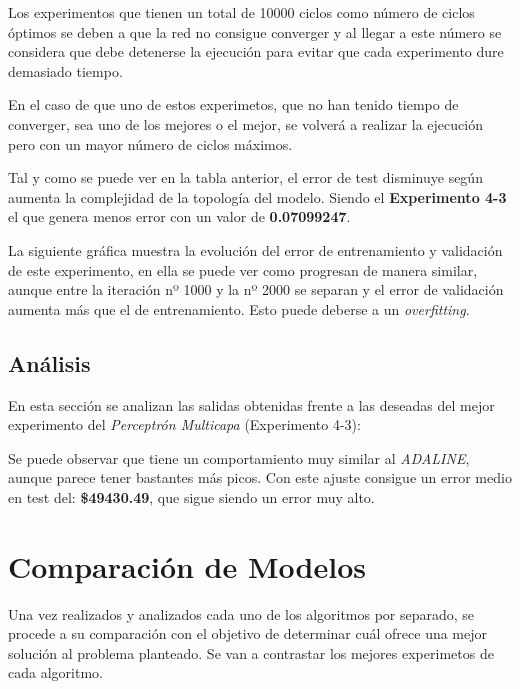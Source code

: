 \documentclass{uc3mpracticas}
\begin{document}
    Los experimentos que tienen un total de 10000 ciclos como número de ciclos óptimos se deben a que la red no consigue converger y al llegar a este número se considera que debe detenerse la ejecución para evitar que cada experimento dure demasiado tiempo.

    \vspace{4mm}

    En el caso de que uno de estos experimetos, que no han tenido tiempo de converger, sea uno de los mejores o el mejor, se volverá a realizar la ejecución pero con un mayor número de ciclos máximos.

    \vspace{5mm}

    Tal y como se puede ver en la tabla anterior, el error de test disminuye según aumenta la complejidad de la topología del modelo. Siendo el \textbf{Experimento 4-3} el que genera menos error con un valor de \textbf{0.07099247}.

    \vspace{4mm}

    La siguiente gráfica muestra la evolución del error de entrenamiento y validación de este experimento, en ella se puede ver como progresan de manera similar, aunque entre la iteración nº 1000 y la nº 2000 se separan y el error de validación aumenta más que el de entrenamiento. Esto puede deberse a un \textit{overfitting}.


    \subsection{Análisis}

    En esta sección se analizan las salidas obtenidas frente a las deseadas del mejor experimento del \textit{Perceptrón Multicapa} (Experimento 4-3):


    Se puede observar que tiene un comportamiento muy similar al \textit{ADALINE}, aunque parece tener bastantes más picos. Con este ajuste consigue un error medio en test del: \textbf{\$49430.49}, que sigue siendo un error muy alto.


  \section{Comparación de Modelos}

  Una vez realizados y analizados cada uno de los algoritmos por separado, se procede a su comparación con el objetivo de determinar cuál ofrece una mejor solución al problema planteado. Se van a contrastar los mejores experimetos de cada algoritmo.
\end{document}
